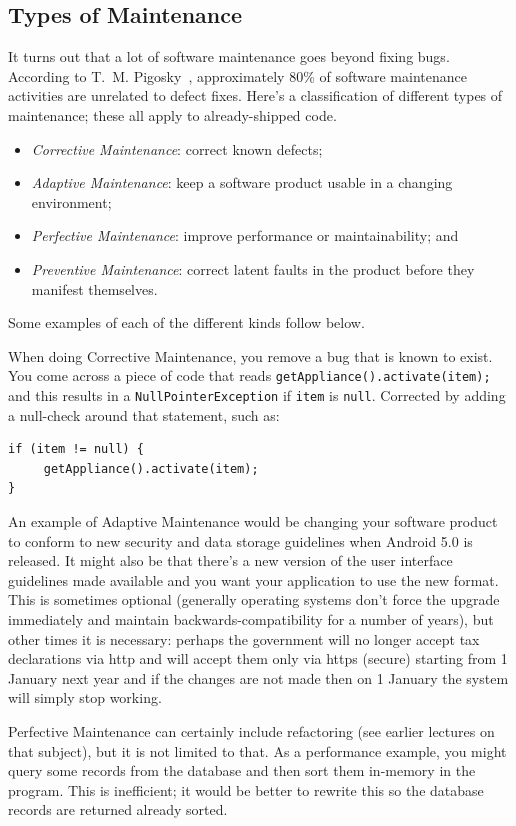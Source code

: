\subsection*{Types of Maintenance}
It turns out that a lot of software maintenance goes beyond
fixing bugs. According to T.~M. Pigosky~\cite{pswm},
approximately 80\% of software maintenance activities are unrelated to
defect fixes.  Here's a classification of different types of
maintenance; these all apply to already-shipped code.
\begin{itemize}
\item \emph{Corrective Maintenance}: correct known defects;
\item \emph{Adaptive Maintenance}: keep a software product usable in a changing environment;
\item \emph{Perfective Maintenance}: improve performance or maintainability; and
\item \emph{Preventive Maintenance}: correct latent faults in the product before they manifest themselves.
\end{itemize}

Some examples of each of the different kinds follow below.

When doing Corrective Maintenance, you remove a bug that is known to exist. You come across a piece of code that reads \texttt{getAppliance().activate(item);} and this results in a \texttt{NullPointerException} if \texttt{item} is \texttt{null}. Corrected by adding a null-check around that statement, such as:
\begin{verbatim} 
if (item != null) {
     getAppliance().activate(item);
}
\end{verbatim}

An example of Adaptive Maintenance would be changing your software product to conform to new security and data storage guidelines when Android 5.0 is released. It might also be that there's a new version of the user interface guidelines made available and you want your application to use the new format. This is sometimes optional (generally operating systems don't force the upgrade immediately and maintain backwards-compatibility for a number of years), but other times it is necessary: perhaps the government will no longer accept tax declarations via http and will accept them only via https (secure) starting from 1 January next year and if the changes are not made then on 1 January the system will simply stop working.

Perfective Maintenance can certainly include refactoring (see earlier lectures on that subject), but it is not limited to that. As a performance example, you might query some records from the database and then sort them in-memory in the program. This is inefficient; it would be better to rewrite this so the database records are returned already sorted. 

